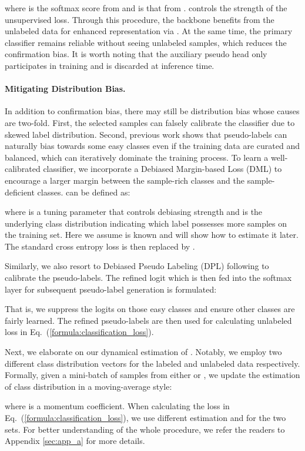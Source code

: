 \documentclass{article}
\begin{document}
where  is the softmax score from  and  is that from .  controls the strength of the unsupervised loss. Through this procedure, the backbone benefits from the unlabeled data for enhanced representation via . At the same time, the primary classifier  remains reliable without seeing unlabeled samples, which reduces the confirmation bias. It is worth noting that the auxiliary pseudo head only participates in training and is discarded at inference time. 


\paragraph{Mitigating Distribution Bias. }
In addition to confirmation bias, there may still be distribution bias whose causes are two-fold. First, the selected samples can falsely calibrate the classifier due to skewed label distribution. Second, previous work \cite{DBLP:conf/cvpr/WangWLY22} shows that pseudo-labels can naturally bias towards some easy classes even if the training data are curated and balanced, which can iteratively dominate the training process. To learn a well-calibrated classifier, we incorporate a Debiased Margin-based Loss (DML)  to encourage a larger margin between the sample-rich classes and the sample-deficient classes.   can be defined as:

where  is a tuning parameter that controls debiasing strength and  is the underlying 
class distribution  indicating which label possesses more samples on the training set. Here we assume  is known and will show how to estimate it later. The standard cross entropy loss  is then replaced by . 

Similarly, we also resort to Debiased Pseudo Labeling (DPL) following \cite{DBLP:conf/iclr/MenonJRJVK21} to calibrate the pseudo-labels. The refined logit  which is then fed into the softmax layer for subsequent pseudo-label generation is formulated:

That is, we suppress the logits on those easy classes and ensure other classes are fairly learned. The refined pseudo-labels are then used for calculating unlabeled loss in Eq.~(\ref{formula:classification_loss}). 

Next, we elaborate on our dynamical estimation of . Notably, we employ two different class distribution vectors for the labeled and unlabeled data respectively. 
Formally, given a mini-batch of samples  from either  or , we update the estimation of class distribution  in a moving-average style:

where  is a momentum coefficient. When calculating the loss in Eq.~(\ref{formula:classification_loss}), we use different estimation  and  for the two sets. For better understanding of the whole procedure, we refer the readers to Appendix \ref{sec:app_a} for more details. 
\end{document}
